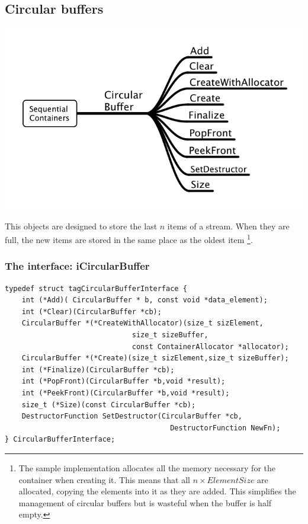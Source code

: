 \documentclass[12pt,a4paper]{memoir} %
\begin{document}
{{\subsection{Circular buffers}
\includegraphics[scale=0.45]{Circular.png}\par
This objects are designed to store the last $n$ items of a stream. When they are full, the new items are stored in the same place as the oldest
item \footnote{The sample implementation allocates all the memory necessary for the container when creating it. This means that all $n\times ElementSize$ are allocated, copying the elements into it as they are added. This simplifies the management of circular buffers but is wasteful when the buffer is half empty.}. 
\subsubsection{The interface: iCircularBuffer}
\begin{verbatim}
typedef struct tagCircularBufferInterface {
    int (*Add)( CircularBuffer * b, const void *data_element);
    int (*Clear)(CircularBuffer *cb);
    CircularBuffer *(*CreateWithAllocator)(size_t sizElement,
                              size_t sizeBuffer,
                              const ContainerAllocator *allocator);
    CircularBuffer *(*Create)(size_t sizElement,size_t sizeBuffer);
    int (*Finalize)(CircularBuffer *cb);
    int (*PopFront)(CircularBuffer *b,void *result);
    int (*PeekFront)(CircularBuffer *b,void *result);
    size_t (*Size)(const CircularBuffer *cb);
    DestructorFunction SetDestructor(CircularBuffer *cb,
                                       DestructorFunction NewFn);
} CircularBufferInterface;
\end{verbatim}
}}
\end{document}
